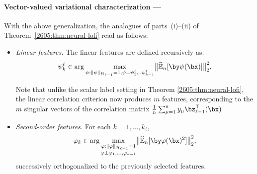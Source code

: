 \paragraph{Vector-valued variational characterization ---} With the above generalization, the analogues of parts~(i)--(ii) of Theorem~\ref{2605:thm:neural-lofi} read as follows:
\begin{itemize}
\item[(i$'$)] \emph{Linear features.} The linear features are defined recursively as:
\begin{equation}\label{2605:eq:vec-lin}
\psi^\ell_k \in \arg\max_{\psi: \|\psi\|_{\mathcal{H}_{\ell-1}}=1,\psi \perp \psi^\ell_1,\cdot, \psi^\ell_{k-1}} \bigl\|\widehat{\mathbb{E}}_n[\by \psi(\bx)]\bigr\|_2^2,
\end{equation}

Note that unlike the scalar label setting in Theorem \ref{2605:thm:neural-lofi}, the linear correlation criterion now produces $m$ features, corresponding to the $m$ singular vectors of the correlation matrix $\frac{1}{n}\sum_{\mu=1}^n y_\mu \bz^\top_{\ell-1}(\bx)$

\item[(ii$'$)] \emph{Second-order features.} For each $k=1,\dots,k_\ell$,
\begin{equation}\label{2605:eq:vec-quad}
\varphi_k \in \arg\max_{\substack{\varphi: \|\varphi\|_{\mathcal{H}_{\ell-1}}=1\\ \varphi\perp \varphi_1,\dots,\varphi_{k-1}}} \bigl\|\widehat{\mathbb{E}}_n[\by \varphi(\bx)^2]\bigr\|_2^2,
\end{equation}
successively orthogonalized to the previously selected features. 
\end{itemize}
